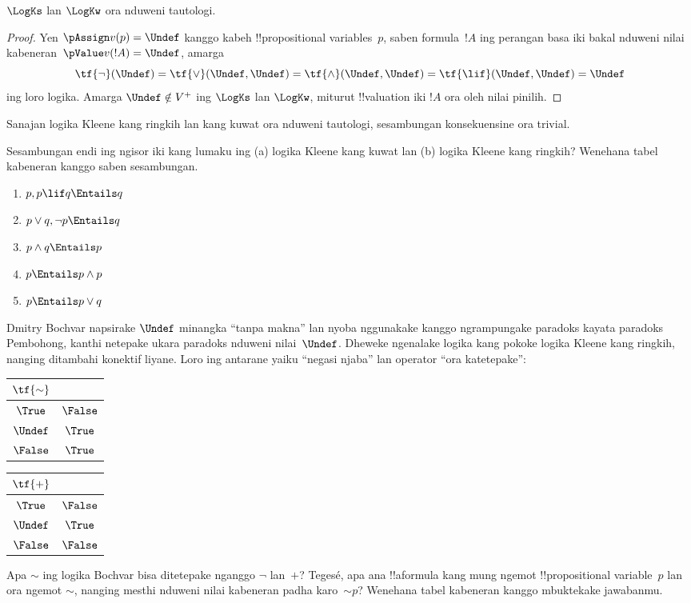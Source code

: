 \documentclass[../../../include/open-logic-section]{subfiles}
\begin{document}
\begin{prop}
  $\LogKs$ lan $\LogKw$ ora nduweni tautologi.
\end{prop}

\begin{proof}
  Yen $\pAssign v(p) = \Undef$ kanggo kabeh !!{propositional variable}s~$p$,
  saben formula~$!A$ ing perangan basa iki bakal nduweni nilai
  kabeneran~$\pValue v(!A) = \Undef$, amarga
  \[
    \tf{\lnot}(\Undef) = \tf{\lor}(\Undef, \Undef) = \tf{\land}(\Undef,
  \Undef) = \tf{\lif}(\Undef, \Undef) = \Undef
  \]
  ing loro logika. Amarga $\Undef \notin V^+$ ing $\LogKs$ lan
  $\LogKw$, miturut !!{valuation} iki $!A$ ora oleh nilai pinilih.
\end{proof}

Sanajan logika Kleene kang ringkih lan kang kuwat ora nduweni
tautologi, sesambungan konsekuensine ora trivial.

\begin{prob}
  Sesambungan endi ing ngisor iki kang lumaku ing (a) logika Kleene
  kang kuwat lan (b) logika Kleene kang ringkih? Wenehana tabel
  kabeneran kanggo saben sesambungan.
  \begin{enumerate}
    \item $p, p \lif q \Entails q$
    \item $p \lor q, \lnot p \Entails q$
    \item $p \land q \Entails p$
    \item $p \Entails p \land p$
    \item $p \Entails p \lor q$
  \end{enumerate}
\end{prob}

Dmitry Bochvar napsirake $\Undef$ minangka ``tanpa makna'' lan nyoba
nggunakake kanggo ngrampungake paradoks kayata paradoks Pembohong,
kanthi netepake ukara paradoks nduweni nilai~$\Undef$. Dheweke
ngenalake logika kang pokoke logika Kleene kang ringkih, nanging
ditambahi konektif liyane. Loro ing antarane yaiku ``negasi njaba''
lan operator ``ora katetepake'':
\begin{center}
  \begin{tabular}{c|c} 
    $\tf{\sim}$ & \\ 
    \hline  
    $\True$ & $\False$ \\ 
    $\Undef$ & $\True$ \\
    $\False$ & $\True$ 
  \end{tabular}
\quad
  \begin{tabular}{c|c} 
    $\tf{+}$ & \\ 
    \hline  
    $\True$ & $\False$ \\ 
    $\Undef$ & $\True$ \\
    $\False$ & $\False$ 
  \end{tabular}
\end{center}

\begin{prob}
  Apa $\sim$ ing logika Bochvar bisa ditetepake nganggo $\lnot$
  lan~$+$? Tegesé, apa ana !!a{formula} kang mung ngemot
  !!{propositional
  variable}~$p$ lan ora ngemot $\sim$, nanging
  mesthi nduweni nilai kabeneran padha karo~$\mathord{\sim}p$?
  Wenehana tabel kabeneran kanggo mbuktekake jawabanmu.
\end{prob}
\end{document}
